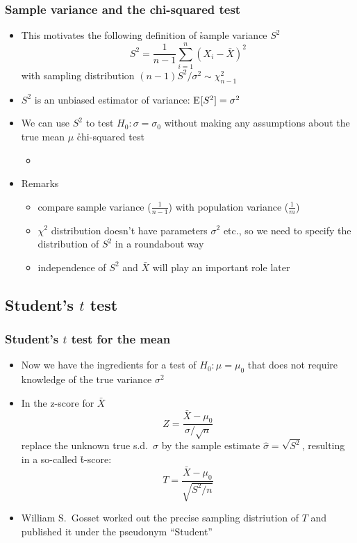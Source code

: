 \documentclass[t,notes=show]{beamer} %
\begin{document}
\begin{frame}
  \frametitle{Sample variance and the chi-squared test}

  \begin{itemize}
  \item This motivates the following definition of \h{sample variance} $S^2$
    \[
    S^2 = \frac{1}{n-1} \sum_{i=1}^n (X_i - \bar{X})^2
    \]
    with sampling distribution $(n-1) S^2 / \sigma^2 \sim \chi^2_{n-1}$
  \item $S^2$ is an unbiased estimator of variance: $\mathrm{E}_{}[S^2] = \sigma^2$
  \item We can use $S^2$ to test $H_0: \sigma = \sigma_0$ without making any
    assumptions about the true mean $\mu$ \so \h{chi-squared test}
    \begin{itemize}
    \item[]
    \end{itemize}
  \item Remarks
    \begin{itemize}
    \item compare sample variance ($\frac{1}{n-1}$) with population variance ($\frac{1}{m}$)
    \item $\chi^2$ distribution doesn't have parameters $\sigma^2$ etc., so we
      need to specify the distribution of $S^2$ in a roundabout way
    \item independence of $S^2$ and $\bar{X}$ will play an important role later
    \end{itemize}
  \end{itemize}
\end{frame}

\subsection{Student's $t$ test}

\begin{frame}
  \frametitle{Student's $t$ test for the mean}

  \begin{itemize}
  \item Now we have the ingredients for a test of $H_0: \mu = \mu_0$ that does
    not require knowledge of the true variance $\sigma^2$
  \item In the z-score for $\bar{X}$
    \[
    Z = \frac{\bar{X} - \mu_0}{\sigma / \sqrt{n}}
    \]
    replace the unknown true s.d.\ $\sigma$ by the sample estimate
    $\hat{\sigma} = \sqrt{S^2}$, resulting in a so-called \h{t-score}:
    \[    
    T = \frac{\bar{X} - \mu_0}{\sqrt{S^2 / n}}
    \]
  \item William S.\ Gosset worked out the precise sampling distriution of
    $T$ and published it under the pseudonym ``Student''
  \end{itemize}
\end{frame}  
\end{document}
